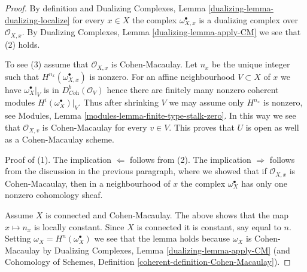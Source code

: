 \documentclass[10pt,a4paper]{amsart}
\theoremstyle{plain}
\theoremstyle{definition}
\theoremstyle{remark}
\numberwithin{equation}{subsection}
\begin{document}
\begin{proof}
By definition and Dualizing Complexes, Lemma
\ref{dualizing-lemma-dualizing-localize} for every $x \in X$
the complex $\omega_{X, x}^\bullet$ is a dualizing complex over
$\mathcal{O}_{X, x}$. By
Dualizing Complexes, Lemma \ref{dualizing-lemma-apply-CM}
we see that (2) holds.

\medskip\noindent
To see (3) assume that $\mathcal{O}_{X, x}$ is Cohen-Macaulay.
Let $n_x$ be the unique integer such that
$H^{n_{x}}(\omega_{X, x}^\bullet)$ is nonzero.
For an affine neighbourhood $V \subset X$
of $x$ we have $\omega_X^\bullet|_V$ is in $D^b_{\textit{Coh}}(\mathcal{O}_V)$
hence there are finitely many nonzero coherent modules
$H^i(\omega_X^\bullet)|_V$. Thus after shrinking $V$ we may assume
only $H^{n_x}$ is nonzero, see
Modules, Lemma \ref{modules-lemma-finite-type-stalk-zero}.
In this way we see that $\mathcal{O}_{X, v}$ is Cohen-Macaulay
for every $v \in V$. This proves that $U$ is open as well
as a Cohen-Macaulay scheme.

\medskip\noindent
Proof of (1). The implication $\Leftarrow$ follows from (2).
The implication $\Rightarrow$ follows from the discussion
in the previous paragraph, where we showed that if $\mathcal{O}_{X, x}$
is Cohen-Macaulay, then in a neighbourhood of $x$ the complex
$\omega_X^\bullet$ has only one nonzero cohomology sheaf.

\medskip\noindent
Assume $X$ is connected and Cohen-Macaulay. The above shows that
the map $x \mapsto n_x$ is locally constant.
Since $X$ is connected it is constant, say equal to $n$.
Setting $\omega_X = H^n(\omega_X^\bullet)$ we see that the lemma
holds because $\omega_X$ is Cohen-Macaulay by
Dualizing Complexes, Lemma \ref{dualizing-lemma-apply-CM}
(and Cohomology of Schemes, Definition
\ref{coherent-definition-Cohen-Macaulay}).
\end{proof}
\end{document}
